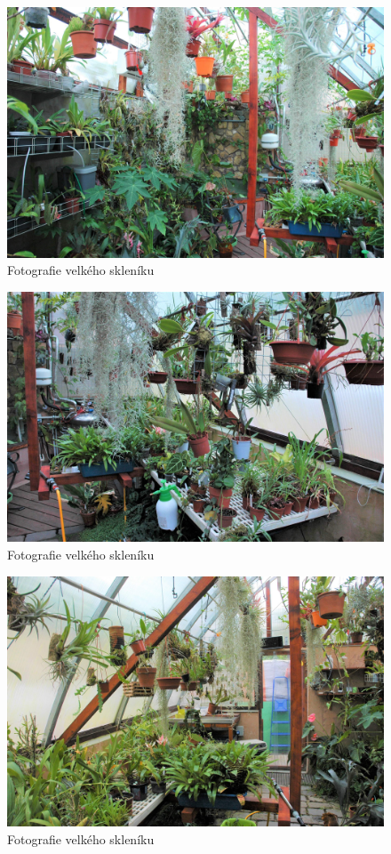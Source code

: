 \begin{figure}[htbp]
    \includegraphics[width=\textwidth]{img/VS_2.jpg}
    \caption{Fotografie velkého skleníku}
    \label{fig:VS2} 
\end{figure}

\begin{figure}[htbp]
    \includegraphics[width=\textwidth]{img/VS_3.jpg}
    \caption{Fotografie velkého skleníku}
    \label{fig:VS3} 
\end{figure}

\begin{figure}[htbp]
    \includegraphics[width=\textwidth]{img/VS_4.jpg}
    \caption{Fotografie velkého skleníku}
    \label{fig:VS4} 
\end{figure}

